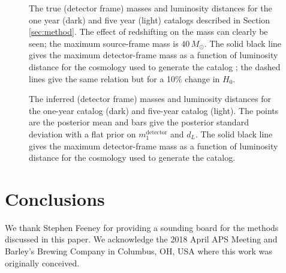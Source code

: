\documentclass[modern]{aastex62}
\newcommand{\monedet}{m_1^\mathrm{detector}}
\newcommand{\MSourceMax}{40 \, \MSun}
\newcommand{\MSun}{M_\odot}
\begin{document}
\begin{figure}
%
  \caption{\label{fig:true-det-masses-dLs} The true (detector frame) masses and
  luminosity distances for the one year (dark) and five year (light) catalogs
  described in Section \ref{sec:method}.  The effect of redshifting on the mass
  can clearly be seen; the maximum source-frame mass is $\MSourceMax$.  The
  solid black line gives the maximum detector-frame mass as a function of
  luminosity distance for the cosmology used to generate the catalog
  \citep{Planck2016}; the dashed lines give the same relation but for a 10\%
  change in $H_0$.}
%
\end{figure}

\begin{figure}
%
  \caption{\label{fig:obs-det-masses-dLs} The inferred (detector frame) masses
  and luminosity distances for the one-year catalog (dark) and five-year catalog
  (light).  The points are the posterior mean and bars give the posterior
  standard deviation with a flat prior on $\monedet$ and $d_L$.  The solid black
  line gives the maximum detector-frame mass as a function of luminosity
  distance for the cosmology used to generate the catalog.}
%
\end{figure}

\section{Conclusions}

\acknowledgments

We thank Stephen Feeney for providing a sounding board for the methods discussed
in this paper.  We acknowledge the 2018 April APS Meeting and Barley's Brewing
Company in Columbus, OH, USA where this work was originally conceived.


\end{document}
